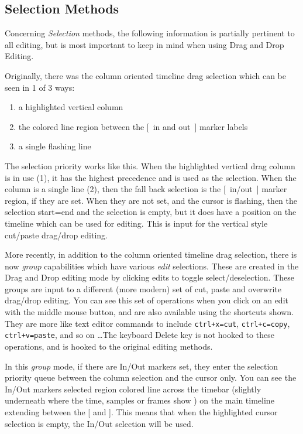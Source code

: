\subsection{Selection Methods}%
\label{sub:selection_method}

Concerning \textit{Selection} methods, the following information is
partially pertinent to all editing, but is most important to keep in
mind when using Drag and Drop Editing.

Originally, there was the column oriented timeline drag selection
which can be seen in 1 of 3 ways:

\begin{enumerate}
\item a highlighted vertical column
\item the colored line region between the [~in and out~] marker
  labels
\item a single flashing line
\end{enumerate}

The selection priority works like this. When the highlighted
vertical drag column is in use (1), it has the highest precedence
and is used as the selection.  When the column is a single line (2),
then the fall back selection is the [~in/out~] marker region, if
they are set.  When they are not set, and the cursor is flashing,
then the selection start=end and the selection is empty, but it does
have a position on the timeline which can be used for editing.  This
is input for the vertical style cut/paste drag/drop editing.

More recently, in addition to the column oriented timeline drag
selection, there is now \textit{group} capabilities which have
various \textit{edit} selections.  These are created in the Drag and
Drop editing mode by clicking edits to toggle
select/deselection.  These groups are input to a different (more
modern) set of cut, paste and overwrite drag/drop editing.  You
can see this set of operations when you click on an edit with the
middle mouse button, and are also available using the shortcuts
shown. They are more like text editor commands to include
\texttt{ctrl+x=cut}, \texttt{ctrl+c=copy}, \texttt{ctrl+v=paste},
and so on \dots The keyboard Delete key is not hooked to these
operations, and is hooked to the original editing methods.

In this \textit{group} mode, if there are In/Out markers set, they
enter the selection priority queue between the column selection and
the cursor only. You can see the In/Out markers selected region
colored line across the timebar (slightly underneath where the time,
samples or frames show ) on the main timeline extending between the
[ and ].  This means that when the highlighted cursor selection is
empty, the In/Out selection will be used.


